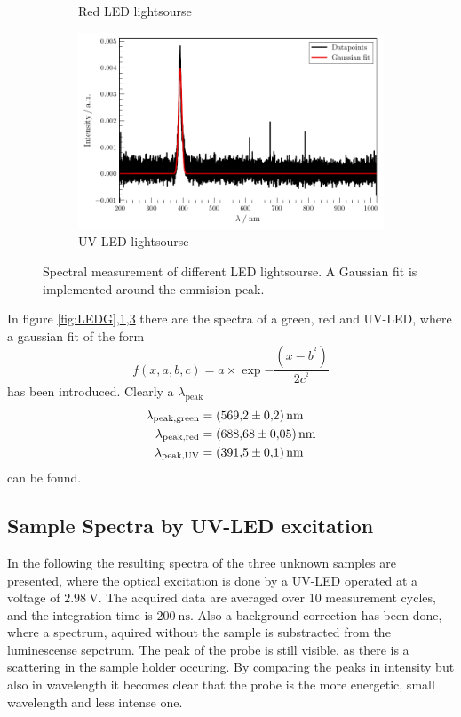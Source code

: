 \begin{figure}
\begin{subfigure}{.3\textwidth}
    \caption{Red LED lightsourse}
    \label{fig:LEDR}
\end{subfigure}
\begin{subfigure}{.3\textwidth}
    \centering
    \includegraphics[width=\textwidth]{plots/LED-UV.pdf}
  \caption{UV LED lightsourse}
    \label{fig:LEDUV}
\end{subfigure}
\caption{Spectral measurement of different LED lightsourse. A Gaussian fit is implemented around the emmision peak.}
\end{figure}


In figure \ref{fig:LEDG},\ref{fig:LEDR},\ref{fig:LEDUV} there are the spectra of a green, red and UV-LED, where a gaussian fit of the form 
\begin{equation}
    f(x,a,b,c) = a \times \exp{-\frac{(x-b^^2)}{2 c^^2}}
\end{equation}\label{eq:gauss}
has been introduced. Clearly a $\lambda_\text{peak}$ 
\begin{align*}
    \lambda_\text{peak,green} &= \SI{569.2 \pm 0.2}{\nano\meter} \\
    \lambda_\text{peak,red} &= \SI{688.68 \pm 0.05}{\nano\meter} \\
    \lambda_\text{peak,UV} &= \SI{391.5 \pm 0.1}{\nano\meter} \\
\end{align*}
can be found.

\subsection{Sample Spectra by UV-LED excitation}
\label{sec:samp_LED}

In the following the resulting spectra of the three unknown samples are presented, where the optical excitation is done by a UV-LED operated at a voltage of $\SI{2.98}{\volt}$.
The acquired data are averaged over 10 measurement cycles, and the integration time is $\SI{200}{\nano\second}$.
Also a background correction has been done, where a spectrum, aquired without the sample is substracted from the luminescense sepctrum.
The peak of the probe is still visible, as there is a scattering in the sample holder occuring.
By comparing the peaks in intensity but also in wavelength it becomes clear that the probe is the more energetic, small wavelength and less intense one.


